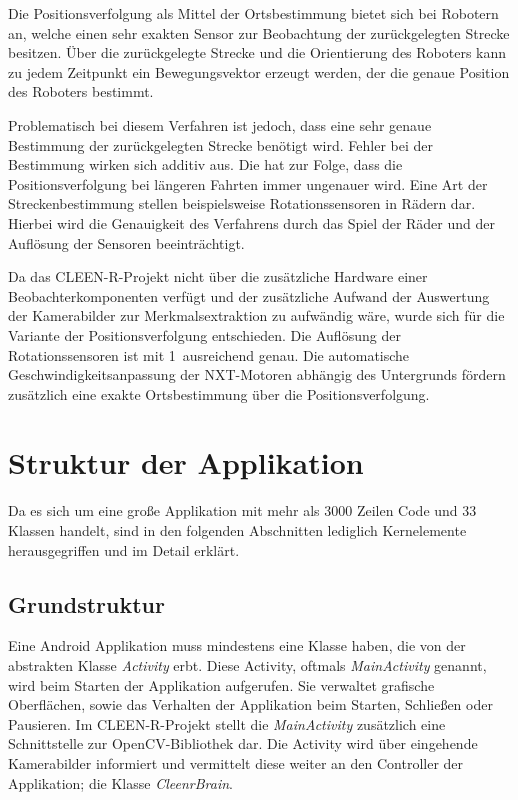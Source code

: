 Die Positionsverfolgung als Mittel der Ortsbestimmung bietet sich bei Robotern an, welche einen sehr exakten Sensor zur Beobachtung der zurückgelegten Strecke besitzen. Über die zurückgelegte Strecke und die Orientierung des Roboters kann zu jedem Zeitpunkt ein Bewegungsvektor erzeugt werden, der die genaue Position des Roboters bestimmt.

Problematisch bei diesem Verfahren ist jedoch, dass eine sehr genaue Bestimmung der zurückgelegten Strecke benötigt wird. Fehler bei der Bestimmung wirken sich additiv aus. Die hat zur Folge, dass die Positionsverfolgung bei längeren Fahrten immer ungenauer wird. Eine Art der Streckenbestimmung stellen beispielsweise Rotationssensoren in Rädern dar. Hierbei wird die Genauigkeit des Verfahrens durch das Spiel der Räder und der Auflösung der Sensoren beeinträchtigt.

Da das CLEEN-R-Projekt nicht über die zusätzliche Hardware einer Beobachterkomponenten verfügt und der zusätzliche Aufwand der Auswertung der Kamerabilder zur Merkmalsextraktion zu aufwändig wäre, wurde sich für die Variante der Positionsverfolgung entschieden. Die Auflösung der Rotationssensoren ist mit 1\degree\ ausreichend genau. Die automatische Geschwindigkeitsanpassung der NXT-Motoren abhängig des Untergrunds fördern zusätzlich eine exakte Ortsbestimmung über die Positionsverfolgung.

\section{Struktur der Applikation}
Da es sich um eine große Applikation mit mehr als 3000 Zeilen Code und 33 Klassen handelt, sind in den folgenden Abschnitten lediglich Kernelemente herausgegriffen und im Detail erklärt.

\subsection{Grundstruktur}
Eine Android Applikation muss mindestens eine Klasse haben, die von der abstrakten Klasse \textit{Activity} erbt. Diese Activity, oftmals \textit{MainActivity} genannt, wird beim Starten der Applikation aufgerufen. Sie verwaltet grafische Oberflächen, sowie das Verhalten der Applikation beim Starten, Schließen oder Pausieren. Im CLEEN-R-Projekt stellt die \textit{MainActivity} zusätzlich eine Schnittstelle zur OpenCV-Bibliothek dar. Die Activity wird über eingehende Kamerabilder informiert und vermittelt diese weiter an den Controller der Applikation; die Klasse \textit{CleenrBrain}.

